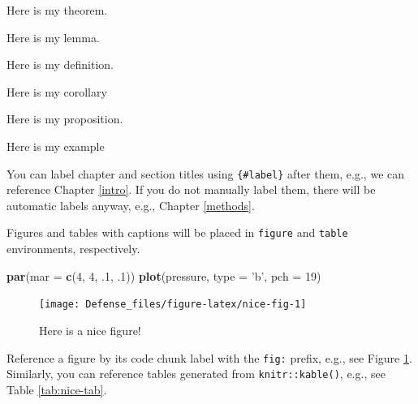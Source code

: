 \documentclass[]{book}
\newenvironment{Shaded}{\begin{snugshade}}{\end{snugshade}}
\newcommand{\KeywordTok}[1]{\textcolor[rgb]{0.13,0.29,0.53}{\textbf{{#1}}}}
\newcommand{\DataTypeTok}[1]{\textcolor[rgb]{0.13,0.29,0.53}{{#1}}}
\newcommand{\DecValTok}[1]{\textcolor[rgb]{0.00,0.00,0.81}{{#1}}}
\newcommand{\StringTok}[1]{\textcolor[rgb]{0.31,0.60,0.02}{{#1}}}
\newcommand{\NormalTok}[1]{{#1}}
\theoremstyle{definition}
\theoremstyle{definition}
\theoremstyle{remark}
\let\BeginKnitrBlock\begin \let\EndKnitrBlock\end
\begin{document}
\BeginKnitrBlock{theorem}
\protect\hypertarget{thm:unnamed-chunk-4}{}{\label{thm:unnamed-chunk-4}}Here
is my theorem.
\EndKnitrBlock{theorem}

\BeginKnitrBlock{lemma}
\protect\hypertarget{lem:unnamed-chunk-5}{}{\label{lem:unnamed-chunk-5}}Here
is my lemma.
\EndKnitrBlock{lemma}

\BeginKnitrBlock{definition}
\protect\hypertarget{def:unnamed-chunk-6}{}{\label{def:unnamed-chunk-6}}Here
is my definition.
\EndKnitrBlock{definition}

\BeginKnitrBlock{corollary}
\protect\hypertarget{cor:unnamed-chunk-7}{}{\label{cor:unnamed-chunk-7}}Here
is my corollary
\EndKnitrBlock{corollary}

\BeginKnitrBlock{proposition}
\protect\hypertarget{prp:unnamed-chunk-8}{}{\label{prp:unnamed-chunk-8}}Here
is my proposition.
\EndKnitrBlock{proposition}

\BeginKnitrBlock{example}
\protect\hypertarget{ex:unnamed-chunk-9}{}{\label{ex:unnamed-chunk-9}}Here
is my example
\EndKnitrBlock{example}

You can label chapter and section titles using \texttt{\{\#label\}}
after them, e.g., we can reference Chapter \ref{intro}. If you do not
manually label them, there will be automatic labels anyway, e.g.,
Chapter \ref{methods}.

Figures and tables with captions will be placed in \texttt{figure} and
\texttt{table} environments, respectively.

\begin{Shaded}
\begin{Highlighting}[]
\KeywordTok{par}\NormalTok{(}\DataTypeTok{mar =} \KeywordTok{c}\NormalTok{(}\DecValTok{4}\NormalTok{, }\DecValTok{4}\NormalTok{, .}\DecValTok{1}\NormalTok{, .}\DecValTok{1}\NormalTok{))}
\KeywordTok{plot}\NormalTok{(pressure, }\DataTypeTok{type =} \StringTok{'b'}\NormalTok{, }\DataTypeTok{pch =} \DecValTok{19}\NormalTok{)}
\end{Highlighting}
\end{Shaded}

\begin{figure}

{\centering \texttt{[image: Defense\_files/figure-latex/nice-fig-1]} 

}

\caption{Here is a nice figure!}\label{fig:nice-fig}
\end{figure}

Reference a figure by its code chunk label with the \texttt{fig:}
prefix, e.g., see Figure \ref{fig:nice-fig}. Similarly, you can
reference tables generated from \texttt{knitr::kable()}, e.g., see Table
\ref{tab:nice-tab}.
\end{document}
